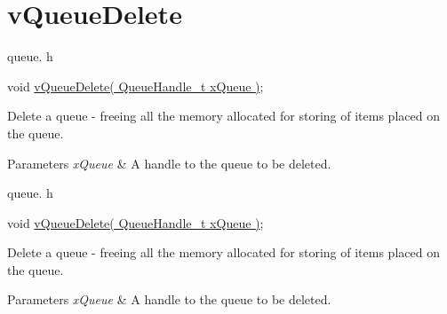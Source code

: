 \hypertarget{group__v_queue_delete}{}\section{v\+Queue\+Delete}
\label{group__v_queue_delete}
queue. h 
\begin{DoxyPre}
void \hyperlink{externals_2freertos_2include_2queue_8h_a707cbcfe3aed6b877b6aa6d9d75a3f22}{vQueueDelete( QueueHandle\_t xQueue )};
\end{DoxyPre}


Delete a queue -\/ freeing all the memory allocated for storing of items placed on the queue.


\begin{DoxyParams}{Parameters}
{\em x\+Queue} & A handle to the queue to be deleted.\\
\hline
\end{DoxyParams}
queue. h 
\begin{DoxyPre}void \hyperlink{externals_2freertos_2include_2queue_8h_a707cbcfe3aed6b877b6aa6d9d75a3f22}{vQueueDelete( QueueHandle\_t xQueue )};\end{DoxyPre}


Delete a queue -\/ freeing all the memory allocated for storing of items placed on the queue.


\begin{DoxyParams}{Parameters}
{\em x\+Queue} & A handle to the queue to be deleted. \\
\hline
\end{DoxyParams}
